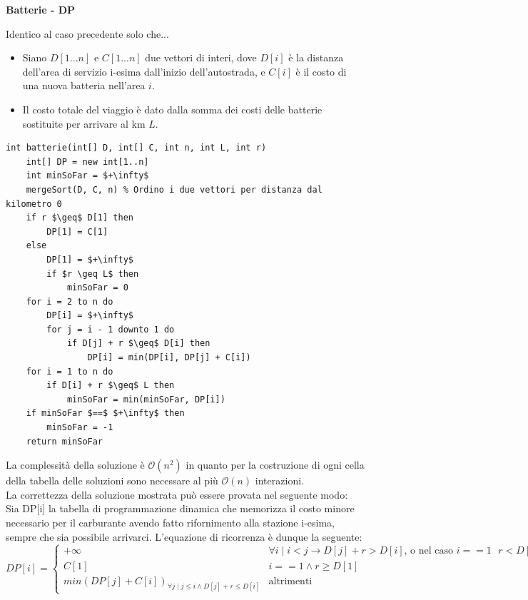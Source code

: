 \documentclass[../cheatSheetAlgoritmi.tex]{subfiles}
\begin{document}
\newpage
\begin{flushleft}
\textbf{Batterie - DP}
\end{flushleft}
Identico al caso precedente solo che...\\
\begin{itemize}
	\item Siano $D[1...n]$ e $C[1...n]$ due vettori di interi, dove $D[i]$ è la distanza dell'area di servizio i-esima dall’inizio dell’autostrada, e $C[i]$ è il costo di una nuova batteria nell'area $i$.
	\item Il costo totale del viaggio è dato dalla somma dei costi delle batterie sostituite per arrivare al km $L$.
\end{itemize}
\begin{lstlisting}[caption=Batterie DP]
int batterie(int[] D, int[] C, int n, int L, int r)
    int[] DP = new int[1..n]
    int minSoFar = $+\infty$
    mergeSort(D, C, n) % Ordino i due vettori per distanza dal kilometro 0
    if r $\geq$ D[1] then
        DP[1] = C[1]
    else
        DP[1] = $+\infty$
        if $r \geq L$ then
            minSoFar = 0
    for i = 2 to n do
        DP[i] = $+\infty$
        for j = i - 1 downto 1 do
            if D[j] + r $\geq$ D[i] then
                DP[i] = min(DP[i], DP[j] + C[i])
    for i = 1 to n do
        if D[i] + r $\geq$ L then
            minSoFar = min(minSoFar, DP[i])
    if minSoFar $==$ $+\infty$ then
        minSoFar = -1
    return minSoFar
\end{lstlisting}
La complessità della soluzione è $\mathcal{O}(n^2)$ in quanto per la costruzione di ogni cella della tabella delle soluzioni sono necessare al più $\mathcal{O}(n)$ interazioni. \\
La correttezza della soluzione mostrata può essere provata nel seguente modo: \\
Sia DP[i] la tabella di programmazione dinamica che memorizza il costo minore necessario per il carburante avendo fatto rifornimento alla stazione i-esima, sempre che sia possibile arrivarci. L'equazione di ricorrenza è dunque la seguente:
\begin{equation*}
    DP[i]=\begin{cases}
        + \infty & \text{$\forall i \mid i < j \rightarrow D[j] + r > D[i]$, o nel caso $i == 1$ $r < D[1]$} \\
        C[1] & \text{$i == 1 \land r \geq D[1]$}\\
        min(DP[j] + C[i])_{\forall j \mid j \leq i \land D[j] + r \leq D[i]} & \text{altrimenti}
    \end{cases}
\end{equation*} \\
\end{document}
